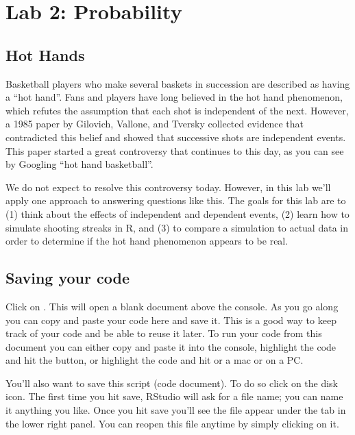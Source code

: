 \documentclass[11pt]{article}
\begin{document}
\section*{Lab 2: Probability}

\subsection*{Hot Hands}

Basketball players who make several baskets in succession are described as having a ``hot hand''. Fans and players have long believed in the hot hand phenomenon, which refutes the assumption that each shot is independent of the next. However, a 1985 paper by Gilovich, Vallone, and Tversky collected evidence that contradicted this belief and showed that successive shots are independent events. This paper started a great controversy that continues to this day, as you can see by Googling ``hot hand basketball''.

We do not expect to resolve this controversy today. However, in this lab we'll apply one approach to answering questions like this. The goals for this lab are to (1) think about the effects of independent and dependent events, (2) learn how to simulate shooting streaks in R, and (3) to compare a simulation to actual data in order to determine if the hot hand phenomenon appears to be real.

\subsection*{Saving your code}

Click on . This will open a blank document above the console. As you go along you can copy and paste your code here and save it. This is a good way to keep track of your code and be able to reuse it later. To run your code from this document you can either copy and paste it into the console, highlight the code and hit the  button, or highlight the code and hit  or a mac or  on a PC.

You'll also want to save this script (code document). To do so click on the disk icon. The first time you hit save, RStudio will ask for a file name; you can name it anything you like. Once you hit save you'll see the file appear under the  tab in the lower right panel. You can reopen this file anytime by simply clicking on it.
\end{document}
